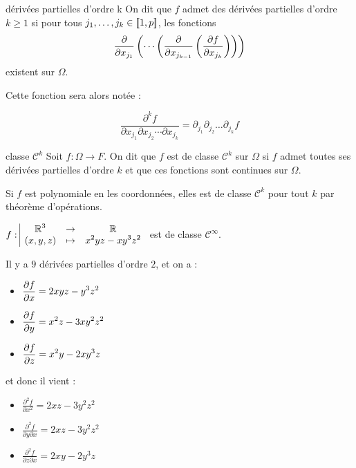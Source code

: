 \begin{proposition}{dérivées partielles d'ordre k}{}
    On dit que $f$ admet des dérivées partielles d'ordre $k \geqslant 1$ si pour tous 
    $j_1, \dots, j_k \in [\![1, p]\!]$, les fonctions
    $$\frac{\partial }{\partial x_{j_1}} \left( \cdots \left( \frac{\partial }{\partial x_{j_{k - 1}}} \left( \frac{\partial f}{\partial x_{j_k}} \right) \right) \right)$$
    existent sur $\Omega$.

    Cette fonction sera alors notée :

    $$\frac{\partial^k f}{\partial x_{j_1} \partial x_{j_2} \cdots \partial x_{j_k}} = \partial_{j_1} \partial_{j_2} \dots \partial_{j_k} f$$
\end{proposition}

\begin{definition}{classe $\mathscr C^k$}{}
    Soit $f : \Omega \to F$. On dit que $f$ est de classe $\mathscr C^k$ sur $\Omega$ si 
    $f$ admet toutes ses dérivées partielles d'ordre $k$ et que ces fonctions sont continues 
    sur $\Omega$.
\end{definition}

\begin{exemple}
    Si $f$ est polynomiale en les coordonnées, elles est de classe $\mathscr C^k$ pour tout 
    $k$ par théorème d'opérations. 

    $f: \space \begin{array}{|ccc} \displaystyle \mathbb{R}^3 & \to & \displaystyle \mathbb{R} \\ \displaystyle (x, y, z) & \mapsto & \displaystyle x^2 y z - x y^3 z^2 \end{array}$ est de classe $\mathscr C^\infty$.

    Il y a $9$ dérivées partielles d'ordre $2$, et on a : 
    \begin{itemize}
        \item $\displaystyle \frac{\partial f}{\partial x} = 2 x y z - y^3 z^2$
        \item $\displaystyle \frac{\partial f}{\partial y} = x^2 z - 3 x y^2 z^2$
        \item $\displaystyle \frac{\partial f}{\partial z} = x^2 y - 2 x y^3 z$
    \end{itemize}

    et donc il vient : 

    \begin{itemize}
        \item $\displaystyle \frac{\partial^2 f}{\partial x^2} = 2 x z - 3 y^2 z^2$
        \item $\displaystyle \frac{\partial^2 f}{\partial y \partial x} = 2 x z - 3 y^2 z^2$
        \item $\displaystyle \frac{\partial^2 f}{\partial z \partial x} = 2 x y - 2 y^3 z$
    \end{itemize}
\end{exemple}

